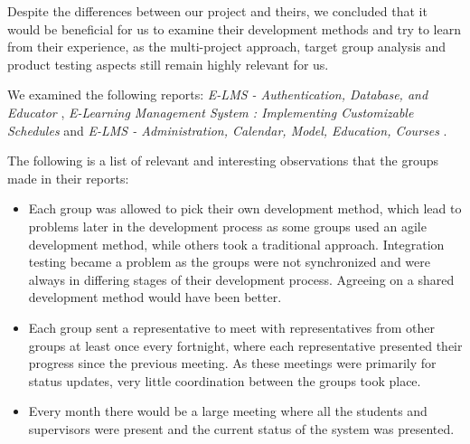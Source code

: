 Despite the differences between our project and theirs, we concluded that it would be beneficial for us to examine their development methods and try to learn from their experience, as the multi-project approach, target group analysis and product testing aspects still remain highly relevant for us. 

We examined the following reports: \emph{E-LMS - Authentication, Database, and Educator} \cite{E-LMS-ADE},  \emph{E-Learning Management System : Implementing Customizable Schedules} \cite{E-LMS-ICS} and \emph{E-LMS - Administration, Calendar, Model, Education, Courses} \cite{E-LMS-ACMEC}.

The following is a list of relevant and interesting observations that the groups made in their reports:
\begin{itemize}
	\item{Each group was allowed to pick their own development method, which lead to problems later in the development process as some groups used an agile development method, while others took a traditional approach. 
	Integration testing became a problem as the groups were not synchronized and were always in differing stages of their development process. 
	Agreeing on a shared development method would have been better.}
	\item{Each group sent a representative to meet with representatives from other groups at least once every fortnight, where each representative presented their progress since the previous meeting. 
	As these meetings were primarily for status updates, very little coordination between the groups took place.}
	\item{Every month there would be a large meeting where all the students and supervisors were present and the current status of the system was presented.}
\end{itemize}

